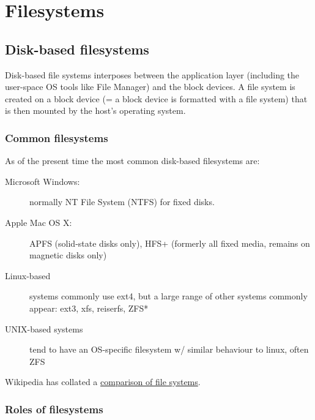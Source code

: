 \chapter{Filesystems}
\label{ch:filesystems}

\section{Disk-based filesystems}
\label{sec:disk-based-filesystems}

Disk-based file systems interposes between the application layer
(including the user-space OS tools like File Manager) and the block
devices. A file system is created on a block device (= a block device is
formatted with a file system) that is then mounted by the host's
operating system.

\subsection{Common filesystems}
\label{sec:common-filesystems}

As of the present time the most common disk-based filesystems are:

\begin{description}
\item[Microsoft Windows:]
normally NT File System (NTFS) for fixed disks.
\item[Apple Mac OS X:]
APFS (solid-state disks only), HFS+ (formerly all fixed media, remains
on magnetic disks only)
\item[Linux-based]
systems commonly use ext4, but a large range of other systems commonly
appear: ext3, xfs, reiserfs, ZFS*
\item[UNIX-based systems]
tend to have an OS-specific filesystem w/ similar behaviour to linux,
often ZFS
\end{description}

Wikipedia has collated a
\href{https://en.wikipedia.org/wiki/Comparison_of_file_systems}{comparison
of file systems}.

\subsection{Roles of filesystems}\label{sec:roles-of-filesystems}

